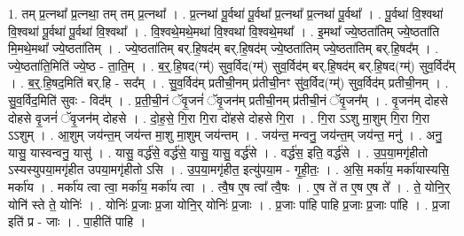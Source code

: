 \documentclass[17pt]{extarticle}
\begin{document}
1. तम् प्र॒त्नथा᳚ प्र॒त्नथा॒ तम् तम् प्र॒त्नथा᳚ । . प्र॒त्नथा॑ पू॒र्वथा॑ पू॒र्वथा᳚ प्र॒त्नथा᳚ प्र॒त्नथा॑ पू॒र्वथा᳚ । . पू॒र्वथा॑ वि॒श्वथा॑ वि॒श्वथा॑ पू॒र्वथा॑ पू॒र्वथा॑ वि॒श्वथा᳚ । . वि॒श्वथे॒मथे॒मथा॑ वि॒श्वथा॑ वि॒श्वथे॒मथा᳚ । . इ॒मथा᳚ ज्ये॒ष्ठता॑तिम् ज्ये॒ष्ठता॑ति मि॒मथे॒मथा᳚ ज्ये॒ष्ठता॑तिम् । . ज्ये॒ष्ठता॑तिम् बर्.हि॒षद॑म् बर्.हि॒षद॑म् ज्ये॒ष्ठता॑तिम् ज्ये॒ष्ठता॑तिम् बर्.हि॒षद᳚म् । . ज्ये॒ष्ठता॑ति॒मिति॑ ज्ये॒ष्ठ - ता॒ति॒म् । . ब॒र्॒.हि॒षद(ग्म्॑) सुव॒र्विद(ग्म्॑) सुव॒र्विद॑म् बर्.हि॒षद॑म् बर्.हि॒षद(ग्म्॑) सुव॒र्विद᳚म् । . ब॒र्॒.हि॒षद॒मिति॑ बर्.हि - सद᳚म् । . सु॒व॒र्विद॑म् प्रतीची॒नम् प्र॑तीची॒नꣳ सु॑व॒र्विद(ग्म्॑) सुव॒र्विद॑म् प्रतीची॒नम् । . सु॒व॒र्विद॒मिति॑ सुवः - विद᳚म् । . प्र॒ती॒ची॒नं ॅवृ॒जनं॑ ॅवृ॒जन॑म् प्रतीची॒नम् प्र॑तीची॒नं ॅवृ॒जन᳚म् । . वृ॒जन॑म् दोहसे दोहसे वृ॒जनं॑ ॅवृ॒जन॑म् दोहसे । . दो॒ह॒से॒ गि॒रा गि॒रा दो॑हसे दोहसे गि॒रा । . गि॒रा ऽऽशु मा॒शुम् गि॒रा गि॒रा ऽऽशुम् । . आ॒शुम् जय॑न्त॒म् जय॑न्त मा॒शु मा॒शुम् जय॑न्तम् । . जय॑न्त॒ मन्वनु॒ जय॑न्त॒म् जय॑न्त॒ मनु॑ । . अनु॒ यासु॒ यास्वन्वनु॒ यासु॑ । . यासु॒ वर्द्ध॑से॒ वर्द्ध॑से॒ यासु॒ यासु॒ वर्द्ध॑से । . वर्द्ध॑स॒ इति॒ वर्द्ध॑से । . उ॒प॒या॒मगृ॑हीतो ऽस्यस्युपया॒मगृ॑हीत उपया॒मगृ॑हीतो ऽसि । . उ॒प॒या॒मगृ॑हीत॒ इत्यु॑पया॒म - गृ॒ही॒तः॒ । . अ॒सि॒ मर्का॑य॒ मर्का॑यास्यसि॒ मर्का॑य । . मर्का॑य त्वा त्वा॒ मर्का॑य॒ मर्का॑य त्वा । . त्वै॒ष ए॒ष त्वा᳚ त्वै॒षः । . ए॒ष ते॑ त ए॒ष ए॒ष ते᳚ । . ते॒ योनि॒र् योनि॑ स्ते ते॒ योनिः॑ । . योनिः॑ प्र॒जाः प्र॒जा योनि॒र् योनिः॑ प्र॒जाः । . प्र॒जाः पा॑हि पाहि प्र॒जाः प्र॒जाः पा॑हि । . प्र॒जा इति॑ प्र - जाः । . पा॒हीति॑ पाहि । \newline
\end{document}

